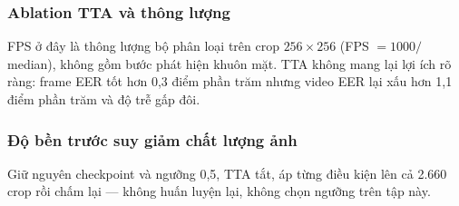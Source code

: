 \documentclass[12pt,a4paper]{article}
\begin{document}
\subsubsection{Ablation TTA và thông lượng}
\begin{table}[H]
  \centering
  \caption{Ảnh hưởng của TTA trên CASIA-FASD (chấm trực tiếp trên crop $256\times256$)}
  \label{tab:fas-tta}
  \footnotesize
\end{table}
FPS ở đây là thông lượng bộ phân loại trên crop $256\times256$ (FPS $= 1000 /$ median), không gồm
bước phát hiện khuôn mặt. TTA không mang lại lợi ích rõ ràng: frame EER tốt hơn 0,3 điểm phần trăm
nhưng video EER lại xấu hơn 1,1 điểm phần trăm và độ trễ gấp đôi.

\subsubsection{Độ bền trước suy giảm chất lượng ảnh}
Giữ nguyên checkpoint và ngưỡng 0,5, TTA tắt, áp từng điều kiện lên cả 2.660 crop rồi chấm lại ---
không huấn luyện lại, không chọn ngưỡng trên tập này.
\end{document}
